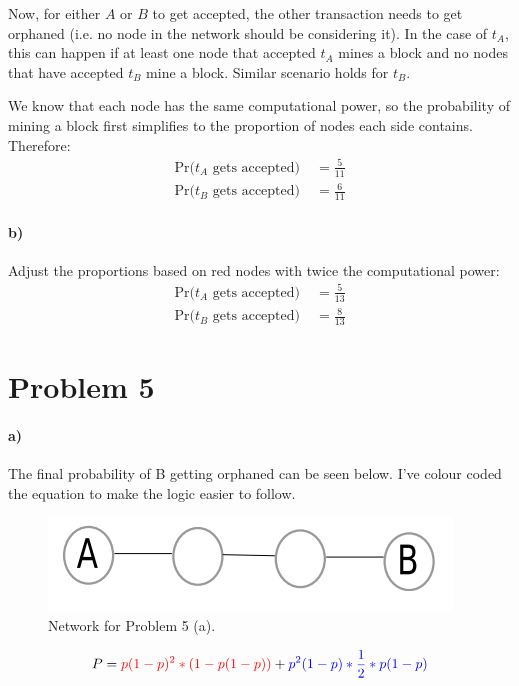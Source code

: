 \documentclass[10pt,letter]{article}
\begin{document}
Now, for either $A$ or $B$ to get accepted, the other transaction needs to get orphaned (i.e. no node in the network should be considering it). In the case of $t_A$, this can happen if at least one node that accepted $t_A$ mines a block and no nodes that have accepted $t_B$ mine a block. Similar scenario holds for $t_B$.

We know that each node has the same computational power, so the probability of mining a block first simplifies to the proportion of nodes each side contains. Therefore:
\begin{align*}
\textrm{Pr($t_A$ gets accepted)}\; &= \frac{5}{11}
\\
\textrm{Pr($t_B$ gets accepted)}\; &= \frac{6}{11}
\end{align*}

\paragraph{b)} Adjust the proportions based on red nodes with twice the computational power:
\begin{align*}
\textrm{Pr($t_A$ gets accepted)}\; &= \frac{5}{13}
\\
\textrm{Pr($t_B$ gets accepted)}\; &= \frac{8}{13}
\end{align*}

\pagebreak

\section*{Problem 5}

\paragraph{a)} The final probability of B getting orphaned can be seen below. I've colour coded the equation to make the logic easier to follow.

\begin{figure}[h!]
\centering
\includegraphics[scale=0.5,keepaspectratio]{hw8_problem5_a}
\caption{Network for Problem 5 (a).}
\end{figure}
\begin{align*}
P = \textcolor{red}{p(1-p)^2 * (1 - p(1-p))} + \textcolor{blue}{p^2(1-p) * \frac{1}{2} * p(1-p)}
\end{align*}
\end{document}
